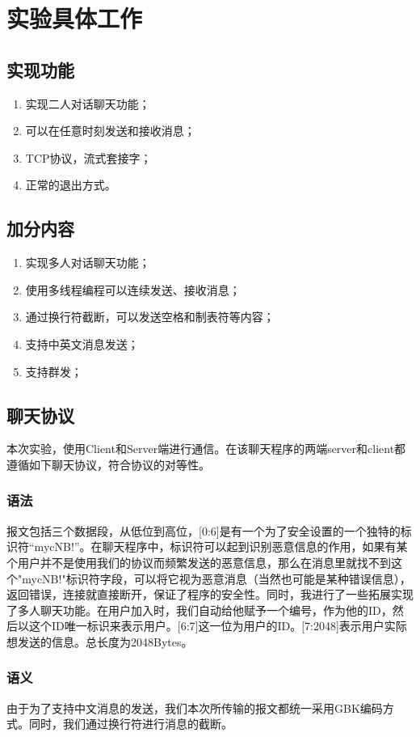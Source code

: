 \documentclass[UTF8,a4paper,10pt]{ctexart}
\begin{document}
\section{实验具体工作}
\subsection{实现功能}
\begin{enumerate}
  \item 实现二人对话聊天功能；
  \item 可以在任意时刻发送和接收消息；
  \item TCP协议，流式套接字；
  \item 正常的退出方式。
\end{enumerate}
\subsection{加分内容}
\begin{enumerate}
  \item 实现多人对话聊天功能；
  \item 使用多线程编程可以连续发送、接收消息；
  \item 通过换行符截断，可以发送空格和制表符等内容；
  \item 支持中英文消息发送；
  \item 支持群发；
\end{enumerate}
\subsection{聊天协议}
本次实验，使用Client和Server端进行通信。在该聊天程序的两端server和client都遵循如下聊天协议，符合协议的对等性。
\subsubsection{语法}
报文包括三个数据段，从低位到高位，[0:6]是有一个为了安全设置的一个独特的标识符“mycNB!”。在聊天程序中，标识符可以起到识别恶意信息的作用，如果有某个用户并不是使用我们的协议而频繁发送的恶意信息，那么在消息里就找不到这个"mycNB!"标识符字段，可以将它视为恶意消息（当然也可能是某种错误信息），返回错误，连接就直接断开，保证了程序的安全性。同时，我进行了一些拓展实现了多人聊天功能。在用户加入时，我们自动给他赋予一个编号，作为他的ID，然后以这个ID唯一标识来表示用户。[6:7]这一位为用户的ID。[7:2048]表示用户实际想发送的信息。总长度为2048Bytes。
\subsubsection{语义}
由于为了支持中文消息的发送，我们本次所传输的报文都统一采用GBK编码方式。同时，我们通过换行符进行消息的截断。
\end{document}
